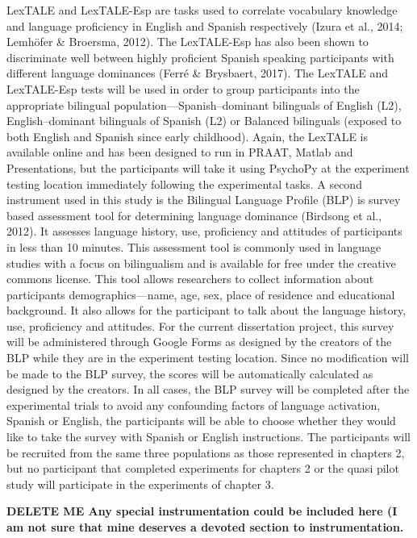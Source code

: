 LexTALE and LexTALE-Esp are tasks used to correlate vocabulary knowledge and language proficiency in English and Spanish respectively (Izura et al., 2014; Lemhöfer \& Broersma, 2012). The LexTALE-Esp has also been shown to discriminate well between highly proficient Spanish speaking participants with different language dominances (Ferré \& Brysbaert, 2017). The LexTALE and LexTALE-Esp tests will be used in order to group participants into the appropriate bilingual population—Spanish–dominant bilinguals of English (L2), English–dominant bilinguals of Spanish (L2) or Balanced bilinguals (exposed to both English and Spanish since early childhood). Again, the LexTALE is available online and has been designed to run in PRAAT, Matlab and Presentations, but the participants will take it using PsychoPy at the experiment testing location immediately following the experimental tasks. 
A second instrument used in this study is the Bilingual Language Profile (BLP) is survey based assessment tool for determining language dominance (Birdsong et al., 2012). It assesses language history, use, proficiency and attitudes of participants in less than 10 minutes. This assessment tool is commonly used in language studies with a focus on bilingualism and is available for free under the creative commons license. This tool allows researchers to collect information about participants demographics—name, age, sex, place of residence and educational background. It also allows for the participant to talk about the language history, use, proficiency and attitudes. For the current dissertation project, this survey will be administered through Google Forms as designed by the creators of the BLP while they are in the experiment testing location. Since no modification will be made to the BLP survey, the scores will be automatically calculated as designed by the creators. In all cases, the BLP survey will be completed after the experimental trials to avoid any confounding factors of language activation, Spanish or English, the participants will be able to choose whether they would like to take the survey with Spanish or English instructions. The participants will be recruited from the same three populations as those represented in chapters 2, but no participant that completed experiments for chapters 2 or the quasi pilot study will participate in the experiments of chapter 3.

\textbf{DELETE ME Any special instrumentation could be included here (I am not sure that mine deserves a devoted section to instrumentation.}


